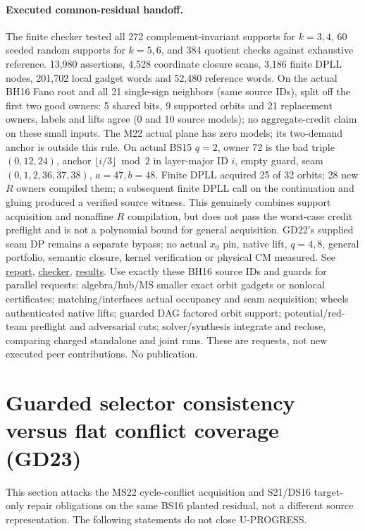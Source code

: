 \documentclass[11pt]{article}
\begin{document}
\paragraph{Executed common-residual handoff.}
The finite checker tested all 272 complement-invariant supports for $k=3,4$, 60 seeded random supports for $k=5,6$, and 384 quotient checks against exhaustive reference. 13,980 assertions, 4,528 coordinate closure scans, 3,186 finite DPLL nodes, 201,702 local gadget words and 52,480 reference words. On the actual BH16 Fano root and all 21 single-sign neighbors (same source IDs), split off the first two good owners: 5 shared bits, 9 supported orbits and 21 replacement owners, labels and lifts agree (0 and 10 source models); no aggregate-credit claim on these small inputs. The M22 actual plane has zero models; its two-demand anchor is outside this rule. On actual BS15 $q=2$, owner 72 is the bad triple $(0,12,24)$, anchor $\lfloor i/3\rfloor\bmod2$ in layer-major ID $i$, empty guard, seam $(0,1,2,36,37,38)$, $a=47,b=48$. Finite DPLL acquired 25 of 32 orbits; 28 new $R$ owners compiled them; a subsequent finite DPLL call on the continuation and gluing produced a verified source witness. This genuinely combines support acquisition and nonaffine $R$ compilation, but does not pass the worst-case credit preflight and is not a polynomial bound for general acquisition. GD22's supplied seam DP remains a separate bypass; no actual $x_0$ pin, native lift, $q=4,8$, general portfolio, semantic closure, kernel verification or physical CM measured. See \href{https://github.com/j15marti/pnp/commit/bdf6cdb7b42fca005deaabb33df6c6790838a874}{report}, \href{https://github.com/j15marti/pnp/commit/faa11602abcd4581b342075a7bc18f97a7d51861}{checker}, \href{https://github.com/j15marti/pnp/commit/e2fb317f33341b133fa3427ce564aafea64c64c8}{results}.
Use exactly these BH16 source IDs and guards for parallel requests: algebra/hub/MS smaller exact orbit gadgets or nonlocal certificates; matching/interfaces actual occupancy and seam acquisition; wheels authenticated native lifts; guarded DAG factored orbit support; potential/red-team preflight and adversarial cuts; solver/synthesis integrate and reclose, comparing charged standalone and joint runs. These are requests, not new executed peer contributions. No publication.


\section{Guarded selector consistency versus flat conflict coverage (GD23)}\label{sec:gd23}
This section attacks the MS22 cycle-conflict acquisition and S21/DS16 target-only repair obligations on the same BS16 planted residual, not a different source representation. The following statements do not close U-PROGRESS.
\end{document}
